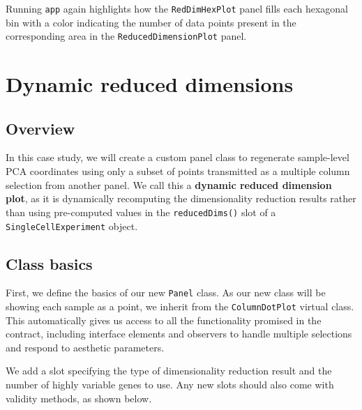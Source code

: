 \documentclass[]{book}
\begin{document}
Running \texttt{app} again highlights how the \texttt{RedDimHexPlot}
panel fills each hexagonal bin with a color indicating the number of
data points present in the corresponding area in the
\texttt{ReducedDimensionPlot} panel.

\chapter{Dynamic reduced dimensions}\label{dynamic-reduced-dimensions}

\section{Overview}\label{overview-1}

In this case study, we will create a custom panel class to regenerate
sample-level PCA coordinates using only a subset of points transmitted
as a multiple column selection from another panel. We call this a
\textbf{dynamic reduced dimension plot}, as it is dynamically
recomputing the dimensionality reduction results rather than using
pre-computed values in the \texttt{reducedDims()} slot of a
\texttt{SingleCellExperiment} object.

\section{Class basics}\label{class-basics}

First, we define the basics of our new \texttt{Panel} class. As our new
class will be showing each sample as a point, we inherit from the
\texttt{ColumnDotPlot} virtual class. This automatically gives us access
to all the functionality promised in the contract, including interface
elements and observers to handle multiple selections and respond to
aesthetic parameters.

We add a slot specifying the type of dimensionality reduction result and
the number of highly variable genes to use. Any new slots should also
come with validity methods, as shown below.
\end{document}
